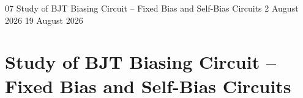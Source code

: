 \begin{refsection}

  \GenerateCoverPage
  {07} %
  {Study of BJT Biasing Circuit – Fixed Bias and Self-Bias Circuits} %
  {2 August 2026} %
  {19 August 2026} %
  \noindent

  \chapter{Study of BJT Biasing Circuit – Fixed Bias and Self-Bias Circuits}

  
  
  
  
  
  
  
  
  

\end{refsection}
